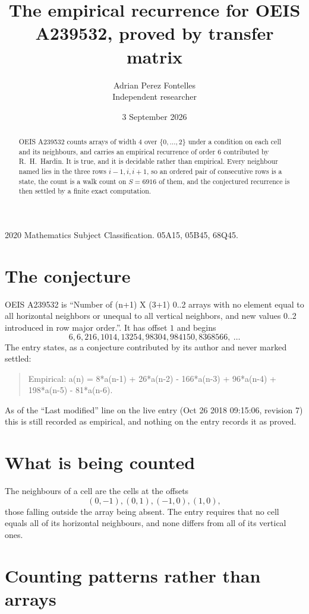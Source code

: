 \documentclass[11pt,a4paper]{article}
\title{The empirical recurrence for OEIS A239532, proved by transfer matrix}
\author{Adrian Perez Fontelles\\ \small Independent researcher}
\date{3 September 2026}
\theoremstyle{plain}
\theoremstyle{definition}
\begin{document}
\maketitle

\begin{abstract}
OEIS A239532 counts arrays of width $4$ over $\{0,\dots,2\}$ under a condition on each cell
and its neighbours, and carries an empirical recurrence of order $6$ contributed by
R.~H.~Hardin. It is true, and it is decidable rather than empirical. Every neighbour named lies
in the three rows $i-1,i,i+1$, so an ordered pair of consecutive rows is a state, the count is
a walk count on $S=6916$ of them, and the conjectured recurrence is then settled by a finite
exact computation.
\end{abstract}

\noindent\small 2020 Mathematics Subject Classification. 05A15, 05B45, 68Q45.\normalsize

\section{The conjecture}

OEIS A239532 is ``Number of (n+1) X (3+1) 0..2 arrays with no element equal to all horizontal neighbors or unequal to all vertical neighbors, and new values 0..2 introduced in row major order.''. It has offset $1$ and begins
\[
6, 6, 216, 1014, 13254, 98304, 984150, 8368566,\ \dots
\]
The entry states, as a conjecture contributed by its author and never marked settled:
\begin{quote}
Empirical: a(n) = 8*a(n-1) + 26*a(n-2) - 166*a(n-3) + 96*a(n-4) + 198*a(n-5) - 81*a(n-6).
\end{quote}
As of the ``Last modified'' line on the live entry (Oct 26 2018 09:15:06, revision 7) this is still
recorded as empirical, and nothing on the entry records it as proved.

\section{What is being counted}

The neighbours of a cell are the cells at the offsets
\[
(0,-1), (0,1), (-1,0), (1,0),
\]
those falling outside the array being absent. The entry requires that no cell equals all of its horizontal neighbours, and none differs from all of its vertical ones.

\section{Counting patterns rather than arrays}
\end{document}

